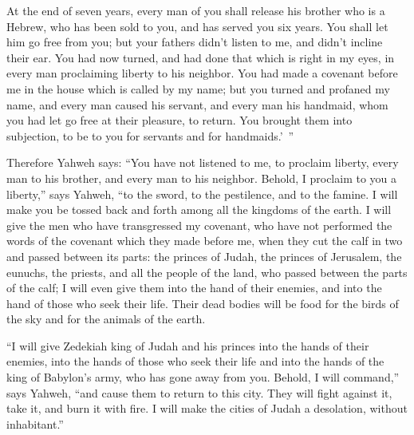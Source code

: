 {At the end of seven years, every man of you shall release his brother who is a Hebrew, who has been sold to you, and has served you six years. You shall let him go free from you; but your fathers didn’t listen to me, and didn’t incline their ear.
You had now turned, and had done that which is right in my eyes, in every man proclaiming liberty to his neighbor. You had made a covenant before me in the house which is called by my name;
but you turned and profaned my name, and every man caused his servant, and every man his handmaid, whom you had let go free at their pleasure, to return. You brought them into subjection, to be to you for servants and for handmaids.’ ”
\par }{\PP {}Therefore Yahweh says: “You have not listened to me, to proclaim liberty, every man to his brother, and every man to his neighbor. Behold, I proclaim to you a liberty,” says Yahweh, “to the sword, to the pestilence, and to the famine. I will make you be tossed back and forth among all the kingdoms of the earth.
I will give the men who have transgressed my covenant, who have not performed the words of the covenant which they made before me, when they cut the calf in two and passed between its parts:
the princes of Judah, the princes of Jerusalem, the eunuchs, the priests, and all the people of the land, who passed between the parts of the calf;
I will even give them into the hand of their enemies, and into the hand of those who seek their life. Their dead bodies will be food for the birds of the sky and for the animals of the earth.
\par }{\PP {}“I will give Zedekiah king of Judah and his princes into the hands of their enemies, into the hands of those who seek their life and into the hands of the king of Babylon’s army, who has gone away from you.
Behold, I will command,” says Yahweh, “and cause them to return to this city. They will fight against it, take it, and burn it with fire. I will make the cities of Judah a desolation, without inhabitant.”

}
